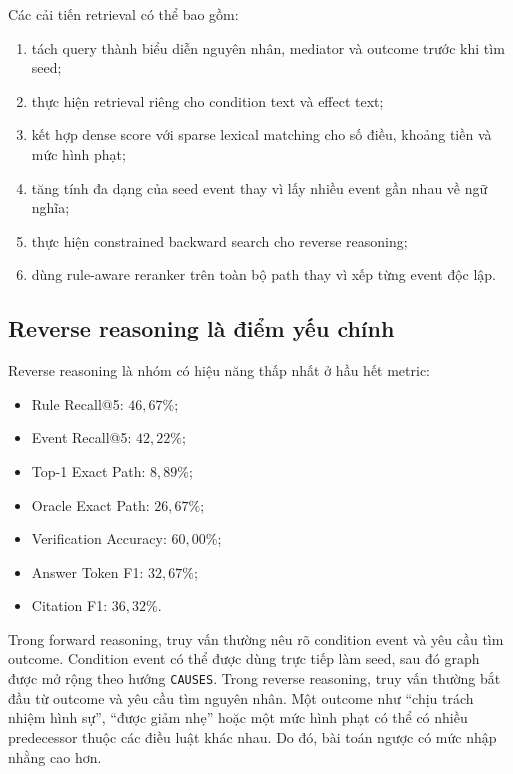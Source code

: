 Các cải tiến retrieval có thể bao gồm:

\begin{enumerate}
    \item tách query thành biểu diễn nguyên nhân, mediator và outcome trước
    khi tìm seed;

    \item thực hiện retrieval riêng cho condition text và effect text;

    \item kết hợp dense score với sparse lexical matching cho số điều,
    khoảng tiền và mức hình phạt;

    \item tăng tính đa dạng của seed event thay vì lấy nhiều event gần nhau
    về ngữ nghĩa;

    \item thực hiện constrained backward search cho reverse reasoning;

    \item dùng rule-aware reranker trên toàn bộ path thay vì xếp từng event
    độc lập.
\end{enumerate}

\subsection{Reverse reasoning là điểm yếu chính}

Reverse reasoning là nhóm có hiệu năng thấp nhất ở hầu hết metric:

\begin{itemize}
    \item Rule Recall@5: \(46{,}67\%\);
    \item Event Recall@5: \(42{,}22\%\);
    \item Top-1 Exact Path: \(8{,}89\%\);
    \item Oracle Exact Path: \(26{,}67\%\);
    \item Verification Accuracy: \(60{,}00\%\);
    \item Answer Token F1: \(32{,}67\%\);
    \item Citation F1: \(36{,}32\%\).
\end{itemize}

Trong forward reasoning, truy vấn thường nêu rõ condition event và yêu cầu
tìm outcome. Condition event có thể được dùng trực tiếp làm seed, sau đó
graph được mở rộng theo hướng \texttt{CAUSES}. Trong reverse reasoning, truy
vấn thường bắt đầu từ outcome và yêu cầu tìm nguyên nhân. Một outcome như
``chịu trách nhiệm hình sự'', ``được giảm nhẹ'' hoặc một mức hình phạt có thể
có nhiều predecessor thuộc các điều luật khác nhau. Do đó, bài toán ngược có
mức nhập nhằng cao hơn.

